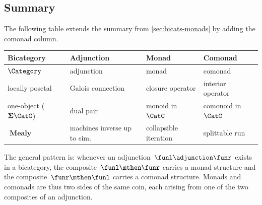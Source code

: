 \subsection{Summary}

The following table extends the summary from \cref{sec:bicats-monads} by adding the comonad column.

\begin{center}
    \begin{tabular}{llll}
        \textbf{Bicategory} & \textbf{Adjunction} & \textbf{Monad} & \textbf{Comonad} \\
        \hline
        $\Category$ & adjunction & monad & comonad \\
        locally posetal & Galois connection & closure operator & interior operator \\
        one-object ($\mathbf{\Sigma}\CatC$) & dual pair & monoid in~$\CatC$ & comonoid in~$\CatC$ \\
        $\operatorname{\textbf{Mealy}}$ & machines inverse up to sim. & collapsible iteration & splittable run \\
    \end{tabular}
\end{center}

The general pattern is: whenever an adjunction~$\funl \adjunction \funr$ exists in a bicategory, the composite~$\funl \mthen \funr$ carries a monad structure and the composite~$\funr \mthen \funl$ carries a comonad structure.
Monads and comonads are thus two sides of the same coin, each arising from one of the two composites of an adjunction.
